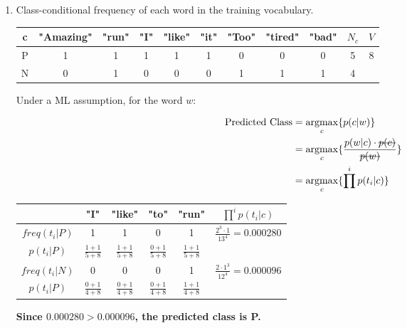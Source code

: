 \documentclass{article}
\DeclareMathOperator*{\argmax}{argmax}
\begin{document}
\begin{enumerate}[leftmargin=\labelsep]
\newpage

\raggedright
\item Class-conditional frequency of each word in the training vocabulary.

\begin{table}[H]
  \centering
  \begin{tabular}{ccccccccccc}
    c & "Amazing" & "run" & "I" & "like" & "it" & "Too" & "tired" & "bad" & $N_c$ & $V$ \\ \midrule
    P & 1 & 1 & 1 & 1 & 1 & 0 & 0 & 0 & 5 & \multirow{2}{*}{8} \\
    N & 0 & 1 & 0 & 0 & 0 & 1 & 1 & 1 & 4 \\
  \end{tabular}
\end{table}

Under a ML assumption, for the word $w$:

\begin{align*}
  \text{Predicted Class} &= \argmax_c \{ p(c|w) \} \\
  &= \argmax_c \{ \frac{p(w|c) \cdot \hbox{\sout{$p(c)$}}}{\hbox{\sout{$p(w)$}}} \} \\
  &= \argmax_c \{ \prod^ip(t_i|c) \}
\end{align*}


\begin{table}[H]
  \centering
  \begin{tabular}{ccccc|c}
     & "I" & "like" & "to" & "run" & $\prod^ip(t_i|c)$ \\ \toprule
    $freq(t_i | P)$ & 1 & 1 & 0 & 1 & \multirow{2}{*}{$\frac{2^3\cdot 1}{13^4}=0.000280$} \\
    $p(t_i|P)$      & $\frac{1+1}{5+8}$ & $\frac{1+1}{5+8}$ & $\frac{0+1}{5+8}$ & $\frac{1+1}{5+8}$ \\ \midrule
    $freq(t_i | N)$ & 0 & 0 & 0 & 1 & \multirow{2}{*}{$\frac{2\cdot 1^3}{12^4}=0.000096$} \\
    $p(t_i|P)$      & $\frac{0+1}{4+8}$ & $\frac{0+1}{4+8}$ & $\frac{0+1}{4+8}$ & $\frac{1+1}{4+8}$ \\
  \end{tabular}
\end{table}

\textbf{
  Since $0.000280 > 0.000096$, the predicted class is P.
}

\centering
{}
\end{enumerate}
\end{document}
